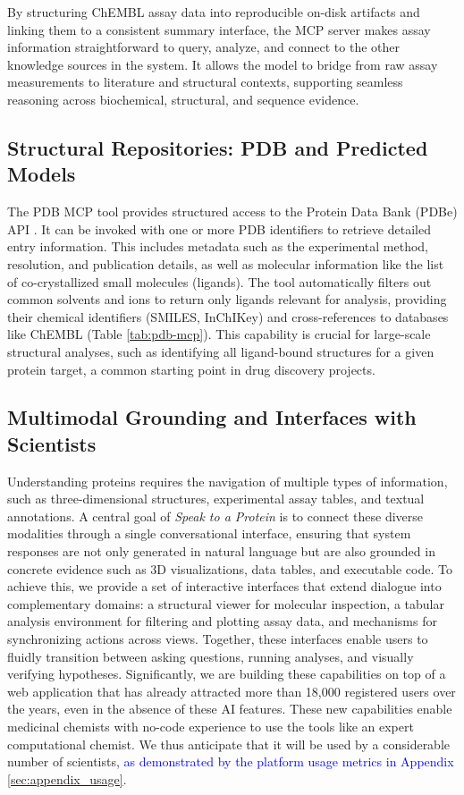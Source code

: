 \documentclass{article}
\newcommand{\new}[1]{\textcolor{blue}{#1}}
\newcommand{\new}[1]{#1}
\begin{document}
By structuring ChEMBL assay data into reproducible on-disk artifacts and linking them to a consistent summary interface, the MCP server makes assay information straightforward to query, analyze, and connect to the other knowledge sources in the system. It allows the model to bridge from raw assay measurements to literature and structural contexts, supporting seamless reasoning across biochemical, structural, and sequence evidence.

\subsection{Structural Repositories: PDB and Predicted Models}\label{sec:data:pdb}
The PDB MCP tool provides structured access to the Protein Data Bank (PDBe) API \citep{Burley2018}. It can be invoked with one or more PDB identifiers to retrieve detailed entry information. This includes metadata such as the experimental method, resolution, and publication details, as well as molecular information like the list of co-crystallized small molecules (ligands). The tool automatically filters out common solvents and ions to return only ligands relevant for analysis, providing their chemical identifiers (SMILES, InChIKey) and cross-references to databases like ChEMBL (Table \ref{tab:pdb-mcp}). This capability is crucial for large-scale structural analyses, such as identifying all ligand-bound structures for a given protein target, a common starting point in drug discovery projects.


\subsection{Multimodal Grounding and Interfaces with Scientists}\label{subsec:viewer}

Understanding proteins requires the navigation of multiple types of information, such as three-dimensional structures, experimental assay tables, and textual annotations. A central goal of \emph{Speak to a Protein} is to connect these diverse modalities through a single conversational interface, ensuring that system responses are not only generated in natural language but are also grounded in concrete evidence such as 3D visualizations, data tables, and executable code. To achieve this, we provide a set of interactive interfaces that extend dialogue into complementary domains: a structural viewer for molecular inspection, a tabular analysis environment for filtering and plotting assay data, and mechanisms for synchronizing actions across views. Together, these interfaces enable users to fluidly transition between asking questions, running analyses, and visually verifying hypotheses. Significantly, we are building these capabilities on top of a web application that has already attracted more than 18,000 registered users over the years, even in the absence of these AI features. These new capabilities enable medicinal chemists with no-code experience to use the tools like an expert computational chemist. We thus anticipate that it will be used by a considerable number of scientists\new{, as demonstrated by the platform usage metrics in Appendix \ref{sec:appendix_usage}}.
\end{document}
